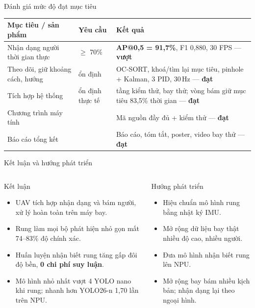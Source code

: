 \documentclass[aspectratio=169,11pt]{beamer}
\newcommand{\so}[1]{{\color{dam}\bfseries #1}}
\begin{document}
\begin{frame}{Đánh giá mức độ đạt mục tiêu}
\small
\begin{tabularx}{\linewidth}{@{}>{\raggedright\arraybackslash}p{4.2cm}>{\raggedright\arraybackslash}p{2.8cm}>{\raggedright\arraybackslash}X@{}}
\toprule
\textbf{Mục tiêu / sản phẩm} & \textbf{Yêu cầu} & \textbf{Kết quả}\\\midrule
Nhận dạng người thời gian thực & $\ge$ 70\% & \so{AP@0,5 = 91,7\%}, F1 0,880, 30 FPS --- \textbf{vượt}\\
Theo dõi, giữ khoảng cách, hướng & ổn định & OC-SORT, khoá/tìm lại mục tiêu, pinhole + Kalman, 3 PID, 30\,Hz --- \textbf{đạt}\\
Tích hợp hệ thống & ổn định thực tế & 7 tầng kiểm thử, bay thử; vòng bám giữ mục tiêu 83,5\% thời gian --- \textbf{đạt}\\
Chương trình máy tính & 01 & Mã nguồn đầy đủ + kiểm thử --- \textbf{đạt}\\
Báo cáo tổng kết & 01 & Báo cáo, tóm tắt, poster, video bay thử --- \textbf{đạt}\\\bottomrule
\end{tabularx}
\end{frame}

\begin{frame}{Kết luận và hướng phát triển}
\begin{columns}[T]
\begin{block}{Kết luận}
\footnotesize
\begin{itemize}
\item UAV tích hợp nhận dạng và bám người, xử lý hoàn toàn trên máy bay.
\item Rung làm mọi bộ phát hiện nhỏ gọn mất 74--83\% độ chính xác.
\item Huấn luyện nhận biết rung tăng gấp đôi độ bền, \textbf{0 chi phí suy luận}.
\item Mô hình nhỏ nhất vượt 4 YOLO nano khi rung; nhanh hơn YOLO26-n 1,70 lần trên NPU.
\end{itemize}
\end{block}
\begin{block}{Hướng phát triển}
\footnotesize
\begin{itemize}
\item Hiệu chuẩn mô hình rung bằng nhật ký IMU.
\item Mở rộng dữ liệu bay thật nhiều độ cao, nhiều người.
\item Đưa mô hình nhận biết rung lên NPU.
\item Mở rộng bay bám nhiều kịch bản; nhận dạng lại theo ngoại hình.
\end{itemize}
\end{block}
\end{columns}
\end{frame}
\end{document}
